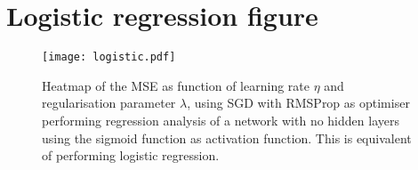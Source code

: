 \clearpage

\section{Logistic regression figure}\label{app:logistic}

\begin{figure}[h!]
    \texttt{[image: logistic.pdf]}
    \caption{Heatmap of the MSE as function of learning rate $\eta$ and regularisation parameter $\lambda$, using SGD with RMSProp as optimiser performing regression analysis of a network with no hidden layers using the sigmoid function as activation function. This is equivalent of performing logistic regression.}
    \label{fig:logistic_eta_lambda}
\end{figure}